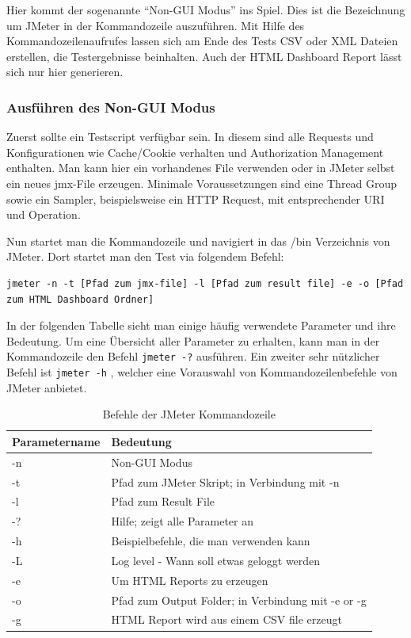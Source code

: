 \documentclass[a4paper,12pt]{article}
\newcommand{\codeInLine}[1]{%
\colorbox{graybackgroundColor}{\lstinline{#1}} %
}
\begin{document}
Hier kommt der sogenannte "`Non-GUI Modus"' ins Spiel. Dies ist die Bezeichnung um JMeter in der Kommandozeile auszuführen. Mit Hilfe des Kommandozeilenaufrufes lassen sich am Ende des Tests CSV oder XML Dateien erstellen, die Testergebnisse beinhalten. Auch der HTML Dashboard Report lässt sich nur hier generieren.

\subsubsection{Ausführen des Non-GUI Modus}
Zuerst sollte ein Testscript verfügbar sein. In diesem sind alle Requests und Konfigurationen wie Cache/Cookie verhalten und Authorization Management enthalten. Man kann hier ein vorhandenes File verwenden oder in JMeter selbst ein neues jmx-File erzeugen. Minimale Voraussetzungen sind eine Thread Group sowie ein Sampler, beispielsweise ein HTTP Request, mit entsprechender URI und Operation.

Nun startet man die Kommandozeile und navigiert in das /bin Verzeichnis von JMeter. Dort startet man den Test via folgendem Befehl:
\begin{lstlisting}
jmeter -n -t [Pfad zum jmx-file] -l [Pfad zum result file] -e -o [Pfad zum HTML Dashboard Ordner]
\end{lstlisting} 
In der folgenden Tabelle sieht man einige häufig verwendete Parameter und ihre Bedeutung. Um eine Übersicht aller Parameter zu erhalten, kann man in der Kommandozeile den Befehl \codeInLine{jmeter -?} ausführen. Ein zweiter sehr nützlicher Befehl ist \codeInLine{jmeter -h}, welcher eine Vorauswahl von Kommandozeilenbefehle von JMeter anbietet.
\begin{table}[H]
	\centering
	\begin{tabular}{|l|l|}
		\hline
		\textbf{Parametername} & \textbf{Bedeutung} \\
		\hline
		-n & Non-GUI Modus \\
		-t & Pfad zum JMeter Skript; in Verbindung mit -n \\
		-l & Pfad zum Result File \\
		-? & Hilfe; zeigt alle Parameter an \\
		-h & Beispielbefehle, die man verwenden kann \\
		-L & Log level - Wann soll etwas geloggt werden \\
		-e & Um HTML Reports zu erzeugen\\
		-o & Pfad zum Output Folder; in Verbindung mit -e or -g \\
		-g & HTML Report wird aus einem CSV file erzeugt \\ 
		\hline
	\end{tabular}
	\caption[tab_parameter_non_gui]{Befehle der JMeter Kommandozeile}
	\label{tab_parameter_non_gui}
\end{table}
\end{document}
